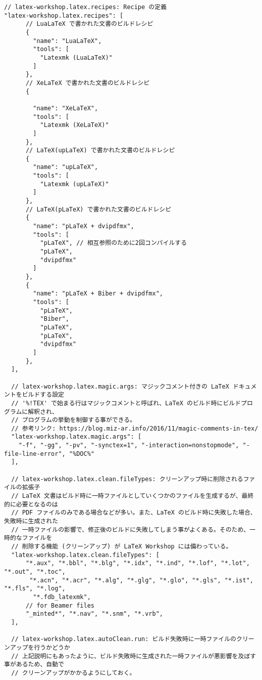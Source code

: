 \documentclass[titlepage]{ltjsarticle}
\begin{document}
\begin{lstlisting}[caption={LaTeX workshopの設定},label=code:latexworkshop]
  // latex-workshop.latex.recipes: Recipe の定義
"latex-workshop.latex.recipes": [
      // LuaLaTeX で書かれた文書のビルドレシピ
      {
        "name": "LuaLaTeX",
        "tools": [
          "Latexmk (LuaLaTeX)"
        ]
      },
      // XeLaTeX で書かれた文書のビルドレシピ
      {
        
        "name": "XeLaTeX",
        "tools": [
          "Latexmk (XeLaTeX)"
        ]
      },
      // LaTeX(upLaTeX) で書かれた文書のビルドレシピ
      {
        "name": "upLaTeX",
        "tools": [
          "Latexmk (upLaTeX)"
        ]
      },
      // LaTeX(pLaTeX) で書かれた文書のビルドレシピ
      {
        "name": "pLaTeX + dvipdfmx",
        "tools": [
          "pLaTeX", // 相互参照のために2回コンパイルする
          "pLaTeX",
          "dvipdfmx"
        ]
      },
      {
        "name": "pLaTeX + Biber + dvipdfmx",
        "tools": [
          "pLaTeX",
          "Biber",
          "pLaTeX",
          "pLaTeX",
          "dvipdfmx"
        ]
      },
  ],

  // latex-workshop.latex.magic.args: マジックコメント付きの LaTeX ドキュメントをビルドする設定
  // '%!TEX' で始まる行はマジックコメントと呼ばれ、LaTeX のビルド時にビルドプログラムに解釈され、
  // プログラムの挙動を制御する事ができる。
  // 参考リンク: https://blog.miz-ar.info/2016/11/magic-comments-in-tex/
  "latex-workshop.latex.magic.args": [
    "-f", "-gg", "-pv", "-synctex=1", "-interaction=nonstopmode", "-file-line-error", "%DOC%"
  ],

  // latex-workshop.latex.clean.fileTypes: クリーンアップ時に削除されるファイルの拡張子
  // LaTeX 文書はビルド時に一時ファイルとしていくつかのファイルを生成するが、最終的に必要となるのは
  // PDF ファイルのみである場合などが多い。また、LaTeX のビルド時に失敗した場合、失敗時に生成された
  // 一時ファイルの影響で、修正後のビルドに失敗してしまう事がよくある。そのため、一時的なファイルを
  // 削除する機能 (クリーンアップ) が LaTeX Workshop には備わっている。
  "latex-workshop.latex.clean.fileTypes": [
      "*.aux", "*.bbl", "*.blg", "*.idx", "*.ind", "*.lof", "*.lot", "*.out", "*.toc",
       "*.acn", "*.acr", "*.alg", "*.glg", "*.glo", "*.gls", "*.ist", "*.fls", "*.log",
        "*.fdb_latexmk", 
      // for Beamer files
      "_minted*", "*.nav", "*.snm", "*.vrb",
  ],

  // latex-workshop.latex.autoClean.run: ビルド失敗時に一時ファイルのクリーンアップを行うかどうか
  // 上記説明にもあったように、ビルド失敗時に生成された一時ファイルが悪影響を及ぼす事があるため、自動で
  // クリーンアップがかかるようにしておく。


\end{lstlisting}
\end{document}
